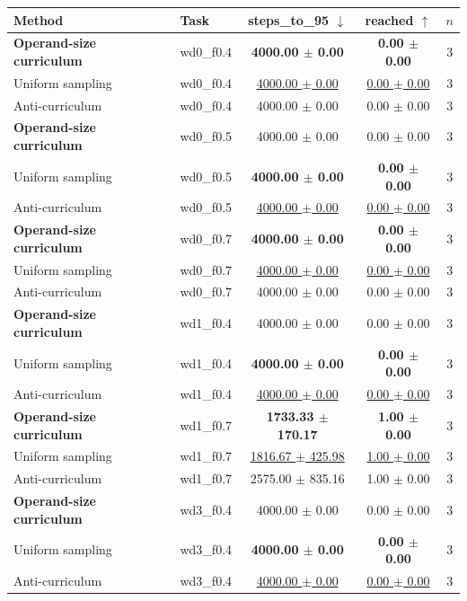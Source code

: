 \begin{tabular}{llccc}
\toprule
Method & Task & steps\_to\_95 $\downarrow$ & reached $\uparrow$ & $n$ \\
\midrule
\textbf{Operand-size curriculum} & wd0\_f0.4 & \textbf{4000.00 $\pm$ 0.00} & \textbf{0.00 $\pm$ 0.00} & 3 \\
Uniform sampling & wd0\_f0.4 & \underline{4000.00 $\pm$ 0.00} & \underline{0.00 $\pm$ 0.00} & 3 \\
Anti-curriculum & wd0\_f0.4 & 4000.00 $\pm$ 0.00 & 0.00 $\pm$ 0.00 & 3 \\
\midrule
\textbf{Operand-size curriculum} & wd0\_f0.5 & 4000.00 $\pm$ 0.00 & 0.00 $\pm$ 0.00 & 3 \\
Uniform sampling & wd0\_f0.5 & \textbf{4000.00 $\pm$ 0.00} & \textbf{0.00 $\pm$ 0.00} & 3 \\
Anti-curriculum & wd0\_f0.5 & \underline{4000.00 $\pm$ 0.00} & \underline{0.00 $\pm$ 0.00} & 3 \\
\midrule
\textbf{Operand-size curriculum} & wd0\_f0.7 & \textbf{4000.00 $\pm$ 0.00} & \textbf{0.00 $\pm$ 0.00} & 3 \\
Uniform sampling & wd0\_f0.7 & \underline{4000.00 $\pm$ 0.00} & \underline{0.00 $\pm$ 0.00} & 3 \\
Anti-curriculum & wd0\_f0.7 & 4000.00 $\pm$ 0.00 & 0.00 $\pm$ 0.00 & 3 \\
\midrule
\textbf{Operand-size curriculum} & wd1\_f0.4 & 4000.00 $\pm$ 0.00 & 0.00 $\pm$ 0.00 & 3 \\
Uniform sampling & wd1\_f0.4 & \textbf{4000.00 $\pm$ 0.00} & \textbf{0.00 $\pm$ 0.00} & 3 \\
Anti-curriculum & wd1\_f0.4 & \underline{4000.00 $\pm$ 0.00} & \underline{0.00 $\pm$ 0.00} & 3 \\
\midrule
\textbf{Operand-size curriculum} & wd1\_f0.7 & \textbf{1733.33 $\pm$ 170.17} & \textbf{1.00 $\pm$ 0.00} & 3 \\
Uniform sampling & wd1\_f0.7 & \underline{1816.67 $\pm$ 425.98} & \underline{1.00 $\pm$ 0.00} & 3 \\
Anti-curriculum & wd1\_f0.7 & 2575.00 $\pm$ 835.16 & 1.00 $\pm$ 0.00 & 3 \\
\midrule
\textbf{Operand-size curriculum} & wd3\_f0.4 & 4000.00 $\pm$ 0.00 & 0.00 $\pm$ 0.00 & 3 \\
Uniform sampling & wd3\_f0.4 & \textbf{4000.00 $\pm$ 0.00} & \textbf{0.00 $\pm$ 0.00} & 3 \\
Anti-curriculum & wd3\_f0.4 & \underline{4000.00 $\pm$ 0.00} & \underline{0.00 $\pm$ 0.00} & 3 \\

\end{tabular}
